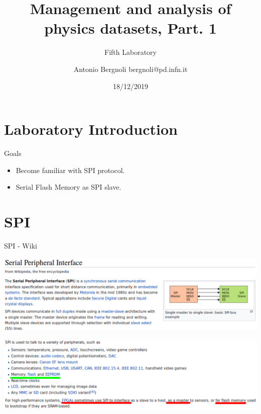 \documentclass[ignorenonframetext,aspectratio=43,]{beamer}
\title{Management and analysis of physics datasets, Part. 1}
\subtitle{Fifth Laboratory}
\author{Antonio Bergnoli bergnoli@pd.infn.it}
\date{18/12/2019}
\begin{document}
\frame{\titlepage}

\begin{frame}
\tableofcontents[hideallsubsections]
\end{frame}
\hypertarget{laboratory-introduction}{%
\part{Laboratory Introduction}\label{laboratory-introduction}}

\begin{frame}{Goals}
\protect\hypertarget{goals}{}

\begin{itemize}
\item
  Become familiar with SPI protocol.
\item
  Serial Flash Memory as SPI slave.
\end{itemize}

\end{frame}

\hypertarget{spi}{%
\part{SPI}\label{spi}}

\begin{frame}{SPI - Wiki}
\protect\hypertarget{spi---wiki}{}

\includegraphics[width=1\textwidth,height=\textheight]{images/spi_1}

\includegraphics[width=1\textwidth,height=\textheight]{images/spi_2}

\end{frame}
\end{document}
